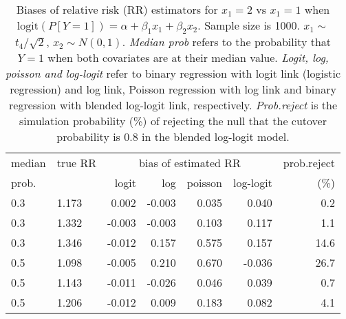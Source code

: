 \documentclass[12pt,a4paper]{article}
\begin{document}
\begin{table}[H] 
\small\sf\centering 
\caption{Biases of relative risk (RR) estimators for $x_1=2$ vs $x_1=1$ when $\mbox{logit}(P[Y=1])=\alpha+\beta_1 x_1 + \beta_2 x_2$. Sample size is 1000. $x_1 \sim $$t_4/\sqrt{2}$, $x_2 \sim N(0,1)$. {\it Median prob} refers to the probability that $Y=1$ when both covariates are at their median value. {\it Logit, log, poisson and log-logit} refer to binary regression with logit link (logistic regression) and log link, Poisson regression with log link and binary regression with blended log-logit link, respectively. {\it Prob.reject} is the simulation probability (\%) of rejecting the null that the cutover probability is $0.8$ in the blended log-logit model.} 
\begin{tabular}{llrrrrr} 
\toprule 
median & true RR & \multicolumn{4}{c}{bias of estimated RR} & prob.reject \\ 
prob. & & logit & log & poisson & log-logit  & (\%) \\ \midrule 
0.3 & 1.173 &  0.002 & -0.003 & 0.035 &  0.040 &  0.2 \\  
0.3 & 1.332 & -0.003 & -0.003 & 0.103 &  0.117 &  1.1 \\  
0.3 & 1.346 & -0.012 &  0.157 & 0.575 &  0.157 & 14.6 \\  
0.5 & 1.098 & -0.005 &  0.210 & 0.670 & -0.036 & 26.7 \\  
0.5 & 1.143 & -0.011 & -0.026 & 0.046 &  0.039 &  0.7 \\  
0.5 & 1.206 & -0.012 &  0.009 & 0.183 &  0.082 &  4.1 \\  
\bottomrule 
\end{tabular} 
\end{table} 
\end{document}
